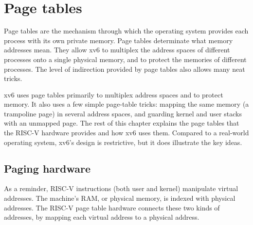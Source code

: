 \chapter{Page tables}
\label{CH:MEM}

Page tables are the mechanism through which the operating system
provides each process with its own private memory.  Page tables
determinate what memory addresses mean.  They allow xv6 to multiplex
the address spaces of different processes onto a single physical
memory, and to protect the memories of different processes.  The level
of indirection provided by page tables also allows many neat tricks.

xv6 uses page tables primarily to multiplex address spaces and to
protect memory.  It also uses a few simple page-table tricks: mapping
the same memory (a trampoline page) in several address spaces, and
guarding kernel and user stacks with an unmapped page.  The rest of
this chapter explains the page tables that the RISC-V hardware
provides and how xv6 uses them.  Compared to a real-world operating
system, xv6's design is restrictive, but it does illustrate the key
ideas.
\section{Paging hardware}
As a reminder,
RISC-V instructions (both user and kernel) manipulate virtual addresses.
The machine's RAM, or physical memory, is indexed with physical
addresses.
The RISC-V page table hardware connects these two kinds of addresses,
by mapping each virtual address to a physical address.

